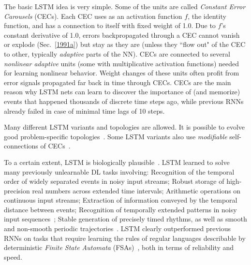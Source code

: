\documentclass[letterpaper]{article}
\begin{document}
\begin{CJK*}{UTF8}{gbsn}
The basic LSTM idea is very simple. Some of the units are called {\em Constant Error Carousels} (CECs).
Each CEC uses as an activation function $f$, the identity function, and 
has a connection to itself with fixed weight of 1.0. Due to $f$'s constant derivative of 1.0,  
errors backpropagated through a CEC cannot vanish or explode (Sec.~\ref{1991a})
but stay as they are (unless they ``flow out" 
of the CEC to other, typically {\em adaptive} parts of the NN). 
CECs are connected to several {\em nonlinear adaptive} units (some with multiplicative
activation functions) 
needed for learning nonlinear behavior. Weight changes of these units often 
profit from error signals propagated far back in time
through CECs. 
CECs are the main reason why LSTM nets can learn to discover the importance of (and memorize) events that happened thousands of discrete time steps ago, while previous RNNs already failed in case of minimal time lags of  10 steps.



Many different LSTM variants and topologies are allowed. 
It is possible to evolve good problem-specific topologies~\citep{DBLP:conf/icann/BayerWTS09}.
Some LSTM variants also use {\em modifiable} self-connections of CECs~\citep{Gers:01ieeetnn}.



To a certain extent, LSTM is biologically plausible~\citep{oreilly:2003}.
LSTM learned to solve many previously unlearnable DL tasks involving:
Recognition of the temporal order of widely separated events in noisy input streams; 
Robust storage of high-precision real numbers across extended time intervals;
Arithmetic operations on continuous input streams;
Extraction of information conveyed by the temporal distance between events;
Recognition of temporally extended patterns in noisy input sequences~\citep{lstm97and95,Gers:2000nc};
Stable generation of precisely timed rhythms, as well as 
smooth and non-smooth periodic trajectories~\citep{Gers:2000b}.
LSTM clearly outperformed
previous RNNs on tasks that
require learning the rules of regular languages describable
by deterministic {\em Finite State Automata} (FSAs)~\citep{Watrous:92nips,casey96dynamics,siegelmann93foundations,Blair+Pollack:1997nc,kalinke98computation,zeng94discrete,Manolios:94,Omlin:96,Omlin:04}, both in terms of reliability and speed.


\end{CJK*}
\end{document}

